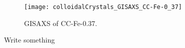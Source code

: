 \documentclass[\main/dresen_thesis.tex]{subfiles}
\begin{document}
  \label{sec:colloidalCrystals:layers:gisaxs}
  \begin{figure}[tb]
    \centering
    \texttt{[image: colloidalCrystals\_GISAXS\_CC-Fe-0\_37]}
    \caption{\label{fig:colloidalCrystals:layers:gisaxs}GISAXS of CC-Fe-0.37.}
  \end{figure}
  Write something
  
\end{document}
